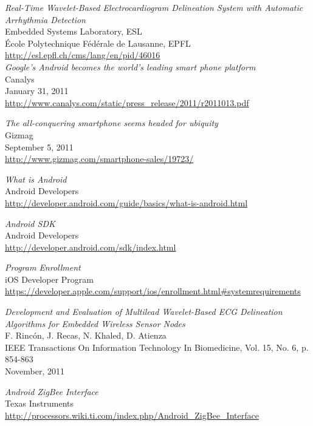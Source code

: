\begin{thebibliography}{widest-label}

 	\emph{Real-Time Wavelet-Based Electrocardiogram Delineation System with Automatic Arrhythmia Detection}\\
 	Embedded Systems Laboratory, ESL\\
 	École Polytechnique Fédérale de Lausanne, EPFL\\
 	\url{http://esl.epfl.ch/cms/lang/en/pid/46016}\\
	
	\emph{Google’s Android becomes the world’s leading smart phone platform}\\
	Canalys\\
	January 31, 2011\\
	\url{http://www.canalys.com/static/press_release/2011/r2011013.pdf}

	\emph{The all-conquering smartphone seems headed for ubiquity}\\
	Gizmag\\
	September 5, 2011\\
	\url{http://www.gizmag.com/smartphone-sales/19723/}
	
	\emph{What is Android}\\
	Android Developers\\
	\url{http://developer.android.com/guide/basics/what-is-android.html}

	\emph{Android SDK}\\
	Android Developers\\
	\url{http://developer.android.com/sdk/index.html}
	
	\emph{Program Enrollment}\\
	iOS Developer Program\\
	\url{https://developer.apple.com/support/ios/enrollment.html#systemrequirements}
	
	\emph{Development and Evaluation of Multilead Wavelet-Based ECG Delineation Algorithms for Embedded Wireless
		Sensor Nodes}\\
	F. Rincón, J. Recas, N. Khaled, D. Atienza\\
	IEEE Transactions On Information Technology In Biomedicine, Vol. 15, No. 6, p. 854-863\\
	November, 2011
	
	\emph{Android ZigBee Interface}\\
	Texas Instruments\\
	\url{http://processors.wiki.ti.com/index.php/Android_ZigBee_Interface}
	

\end{thebibliography}
